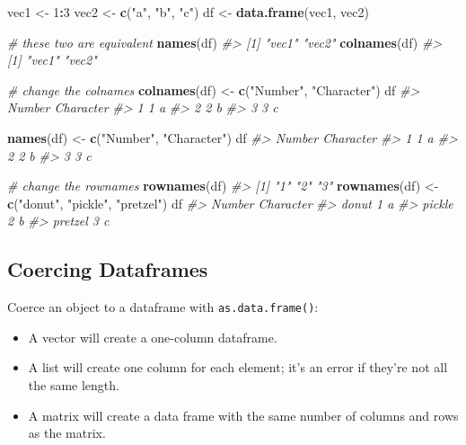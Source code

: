 \documentclass[]{book}
\newenvironment{Shaded}{\begin{snugshade}}{\end{snugshade}}
\newcommand{\KeywordTok}[1]{\textcolor[rgb]{0.13,0.29,0.53}{\textbf{#1}}}
\newcommand{\DecValTok}[1]{\textcolor[rgb]{0.00,0.00,0.81}{#1}}
\newcommand{\StringTok}[1]{\textcolor[rgb]{0.31,0.60,0.02}{#1}}
\newcommand{\CommentTok}[1]{\textcolor[rgb]{0.56,0.35,0.01}{\textit{#1}}}
\newcommand{\OperatorTok}[1]{\textcolor[rgb]{0.81,0.36,0.00}{\textbf{#1}}}
\newcommand{\NormalTok}[1]{#1}
\begin{document}
\begin{Shaded}
\begin{Highlighting}[]
\NormalTok{vec1 <-}\StringTok{ }\DecValTok{1}\OperatorTok{:}\DecValTok{3}
\NormalTok{vec2 <-}\StringTok{ }\KeywordTok{c}\NormalTok{(}\StringTok{"a"}\NormalTok{, }\StringTok{"b"}\NormalTok{, }\StringTok{"c"}\NormalTok{)}
\NormalTok{df <-}\StringTok{ }\KeywordTok{data.frame}\NormalTok{(vec1, vec2)}

\CommentTok{# these two are equivalent}
\KeywordTok{names}\NormalTok{(df)}
\CommentTok{#> [1] "vec1" "vec2"}
\KeywordTok{colnames}\NormalTok{(df)}
\CommentTok{#> [1] "vec1" "vec2"}

\CommentTok{# change the colnames}
\KeywordTok{colnames}\NormalTok{(df) <-}\StringTok{ }\KeywordTok{c}\NormalTok{(}\StringTok{"Number"}\NormalTok{, }\StringTok{"Character"}\NormalTok{)}
\NormalTok{df}
\CommentTok{#>   Number Character}
\CommentTok{#> 1      1         a}
\CommentTok{#> 2      2         b}
\CommentTok{#> 3      3         c}

\KeywordTok{names}\NormalTok{(df) <-}\StringTok{ }\KeywordTok{c}\NormalTok{(}\StringTok{"Number"}\NormalTok{, }\StringTok{"Character"}\NormalTok{)}
\NormalTok{df}
\CommentTok{#>   Number Character}
\CommentTok{#> 1      1         a}
\CommentTok{#> 2      2         b}
\CommentTok{#> 3      3         c}

\CommentTok{# change the rownames}
\KeywordTok{rownames}\NormalTok{(df) }
\CommentTok{#> [1] "1" "2" "3"}
\KeywordTok{rownames}\NormalTok{(df) <-}\StringTok{ }\KeywordTok{c}\NormalTok{(}\StringTok{"donut"}\NormalTok{, }\StringTok{"pickle"}\NormalTok{, }\StringTok{"pretzel"}\NormalTok{)}
\NormalTok{df}
\CommentTok{#>         Number Character}
\CommentTok{#> donut        1         a}
\CommentTok{#> pickle       2         b}
\CommentTok{#> pretzel      3         c}
\end{Highlighting}
\end{Shaded}

\subsection{Coercing Dataframes}\label{coercing-dataframes}

Coerce an object to a dataframe with \texttt{as.data.frame()}:

\begin{itemize}
\item
  A vector will create a one-column dataframe.
\item
  A list will create one column for each element; it's an error if
  they're not all the same length.
\item
  A matrix will create a data frame with the same number of columns and
  rows as the matrix.
\end{itemize}
\end{document}
